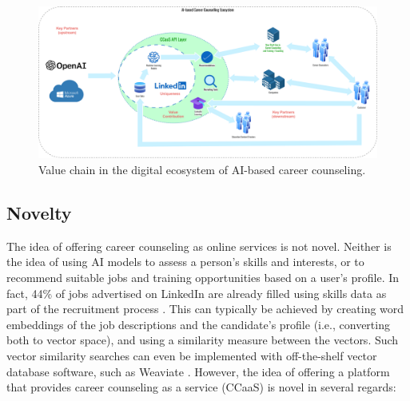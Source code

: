 \begin{figure}[h!]
    \centering
    \caption{Value chain in the digital ecosystem of AI-based career counseling.}
    \label{fig:value_chain}
    \includegraphics[width=\textwidth]{figures/value-chain.pdf}
\end{figure}

\subsection{Novelty}

The idea of offering career counseling as online services is not novel. Neither is the idea of
using AI models to assess a person's skills and interests, or to recommend suitable jobs and training
opportunities based on a user's profile. In fact, 44\% of jobs advertised on LinkedIn are already
filled using skills data as part of the recruitment process \citep{kaserAIpoweredCareerCounseling2023}.
This can typically be achieved by creating word embeddings of the job descriptions and the candidate's
profile (i.e., converting both to vector space), and using a similarity measure between the
vectors. Such vector similarity searches can even be implemented with off-the-shelf vector database
software, such as Weaviate \citep{dilockerWeaviate2023}. However, the idea of offering a platform that
provides career counseling as a service (CCaaS) is novel in several regards:

